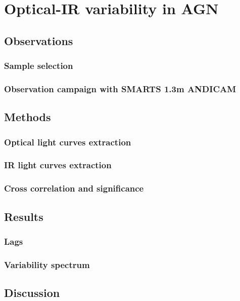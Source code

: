 \chapter{Optical-IR variability in AGN}



\section{Observations}
\subsection{Sample selection}
\subsection{Observation campaign with SMARTS 1.3m ANDICAM} \label{ssec:obs_strategy}
\section{Methods}
\subsection{Optical light curves extraction}
\subsection{IR light curves extraction}
\subsection{Cross correlation and significance}
\section{Results}
\subsection{Lags}
\subsection{Variability spectrum}
\section{Discussion}
